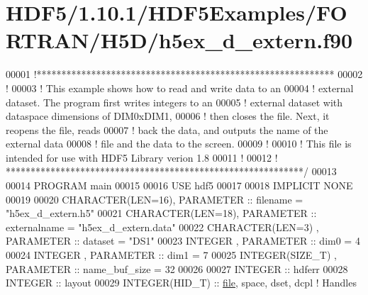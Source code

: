 \hypertarget{_h_d_f5_21_810_81_2_h_d_f5_examples_2_f_o_r_t_r_a_n_2_h5_d_2h5ex__d__extern_8f90_source}{}\section{H\+D\+F5/1.10.1/\+H\+D\+F5\+Examples/\+F\+O\+R\+T\+R\+A\+N/\+H5\+D/h5ex\+\_\+d\+\_\+extern.f90}
\label{_h_d_f5_21_810_81_2_h_d_f5_examples_2_f_o_r_t_r_a_n_2_h5_d_2h5ex__d__extern_8f90_source}

\begin{DoxyCode}
00001 \textcolor{comment}{!************************************************************}
00002 \textcolor{comment}{!}
00003 \textcolor{comment}{!  This example shows how to read and write data to an}
00004 \textcolor{comment}{!  external dataset.  The program first writes integers to an}
00005 \textcolor{comment}{!  external dataset with dataspace dimensions of DIM0xDIM1,}
00006 \textcolor{comment}{!  then closes the file.  Next, it reopens the file, reads}
00007 \textcolor{comment}{!  back the data, and outputs the name of the external data}
00008 \textcolor{comment}{!  file and the data to the screen.}
00009 \textcolor{comment}{!}
00010 \textcolor{comment}{!  This file is intended for use with HDF5 Library verion 1.8}
00011 \textcolor{comment}{!}
00012 \textcolor{comment}{! ************************************************************/}
00013 
00014 \textcolor{keyword}{PROGRAM} main
00015 
00016   \textcolor{keywordtype}{USE }hdf5
00017 
00018   \textcolor{keywordtype}{IMPLICIT NONE}
00019 
00020   \textcolor{keywordtype}{CHARACTER(LEN=16)}, \textcolor{keywordtype}{PARAMETER} :: filename     = \textcolor{stringliteral}{"h5ex\_d\_extern.h5"}
00021   \textcolor{keywordtype}{CHARACTER(LEN=18)}, \textcolor{keywordtype}{PARAMETER} :: externalname = \textcolor{stringliteral}{"h5ex\_d\_extern.data"}
00022   \textcolor{keywordtype}{CHARACTER(LEN=3)} , \textcolor{keywordtype}{PARAMETER} :: dataset  = \textcolor{stringliteral}{"DS1"}
00023   \textcolor{keywordtype}{INTEGER}          , \textcolor{keywordtype}{PARAMETER} :: dim0     = 4
00024   \textcolor{keywordtype}{INTEGER}          , \textcolor{keywordtype}{PARAMETER} :: dim1     = 7
00025   \textcolor{keywordtype}{INTEGER(SIZE\_T)}  , \textcolor{keywordtype}{PARAMETER} :: name\_buf\_size = 32
00026 
00027   \textcolor{keywordtype}{INTEGER} :: hdferr
00028   \textcolor{keywordtype}{INTEGER} :: layout
00029   \textcolor{keywordtype}{INTEGER(HID\_T)}  :: \hyperlink{structfile}{file}, space, dset, dcpl \textcolor{comment}{! Handles}

\end{DoxyCode}
